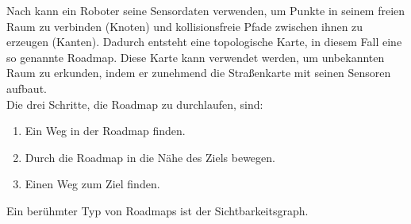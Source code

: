 %
Nach \cite{Principles:05} kann ein Roboter seine Sensordaten verwenden, um Punkte in seinem freien Raum zu verbinden (Knoten) und kollisionsfreie Pfade zwischen ihnen zu erzeugen (Kanten). Dadurch entsteht eine topologische Karte, in diesem Fall eine so genannte Roadmap. Diese Karte kann verwendet werden, um unbekannten Raum zu erkunden, indem er zunehmend die Stra{ß}enkarte mit seinen Sensoren aufbaut.\\
Die drei Schritte, die Roadmap zu durchlaufen, sind: 
\begin{enumerate}
	\item Ein Weg in der Roadmap finden.
	\item Durch die Roadmap in die Nähe des Ziels bewegen.
	\item Einen Weg zum Ziel finden.
\end{enumerate}
Ein berühmter Typ von Roadmaps ist der Sichtbarkeitsgraph.


